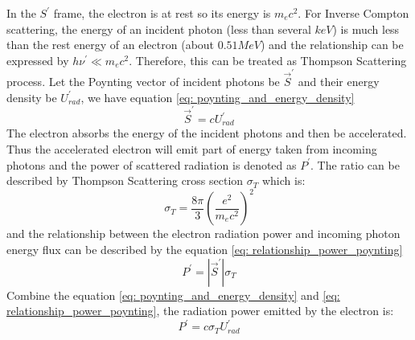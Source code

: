 \documentclass[12pt]{report}
\begin{document}
          In the $S^{\prime}$ frame, the electron is at rest so its energy is $m_e c^2$. 
          For Inverse Compton scattering, the energy of an incident photon (less than several $keV$) 
          is much less than the rest energy of an electron (about $0.51MeV$) 
          and the relationship can be expressed by 
          $h\nu^{\prime} \ll m_e c^2$. Therefore, this can be treated as Thompson Scattering process. 
          Let the Poynting vector of incident photons be $\vec{S}^{\prime}$ and their energy density 
          be $U_{rad}^{\prime}$, we have equation \ref{eq: poynting_and_energy_density}
          \begin{equation}
            \label{eq: poynting_and_energy_density}
            \vec{S}^{\prime} = c U_{rad}^{\prime}
          \end{equation}
          The electron absorbs the energy of the incident photons and then be accelerated. Thus the 
          accelerated electron will emit part of energy taken from incoming photons and the power of 
          scattered radiation is denoted as $P^{\prime}$.
          The ratio can be described by Thompson Scattering cross section $\sigma_{T}$ which is:
          \begin{equation}
            \label{eq: thompson_cross_section}
            \sigma_{T} = \frac{8\pi}{3} \left(\frac{e^2}{m_e c^2}\right)^2
          \end{equation}
          and the relationship between the electron radiation power and incoming photon energy flux can be 
          described by the equation \ref{eq: relationship_power_poynting}
          \begin{equation}
            \label{eq: relationship_power_poynting}
            P^{\prime} = \left| \vec{S}^{\prime} \right| \sigma_{T}
          \end{equation}
          Combine the equation \ref{eq: poynting_and_energy_density} and \ref{eq: relationship_power_poynting},
          the radiation power emitted by the electron is: 
          \begin{equation}
            \label{eq: final_relationship}
            P^{\prime} = c \sigma_{T} U^{\prime}_{rad}
          \end{equation}
\end{document}
